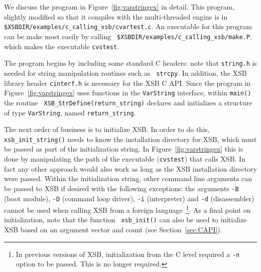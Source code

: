We discuss the program in Figure~\ref{fig:varstringex} in detail.
This program, slightly modified so that it compiles with the
multi-threaded engine is in {\tt
  \$XSBDIR/examples/c\_calling\_xsb/cvartest.c}.  An executable for
this program can be make most easily by calling {\tt
  \$XSBDIR/examples/c\_calling\_xsb/make.P}, which makes the
executable {\tt cvstest}.

The program begins by including some standard C headers: note that
{\tt string.h} is needed for string manipulation routines such as {\tt
  strcpy}.  In addition, the XSB library header {\tt cinterf.h} is
necessary for the XSB C API.  Since the program in
Figure~\ref{fig:varstringex} uses functions in the {\tt VarString}
interface, within {\tt main()} the routine {\tt
  XSB\_StrDefine(return\_string)} declares and initializes a structure
of type {\tt VarString}, named {\tt return\_string}.

The next order of business is to initialize XSB.  In order to do this,
{\tt xsb\_init\_string()} needs to know the installation directory for
XSB, which must be passed as part of the initialization string.  In
Figure~\ref{fig:varstringex} this is done by manipulating the path of
the executable ({\tt cvstest}) that calls XSB.  In fact any other
approach would also work as long as the XSB installation directory
were passed.  Within the initialization string, other command line
arguments can be passed to XSB if desired with the following
exceptions: the arguments {\tt -B} (boot module), {\tt -D} (command
loop driver), {\tt -i} (interpreter) and {\tt -d} (disassembler)
cannot be used when calling XSB from a foreign language~\footnote{In
  previous versions of XSB, initialization from the C level required a
  {\tt -n} option to be passed.  This is no longer required.}.  As a
final point on initialization, note that the function {\tt
  xsb\_init()} can also be used to initialize XSB based on an argument
vector and count (see Section~\ref{sec:CAPI}).


